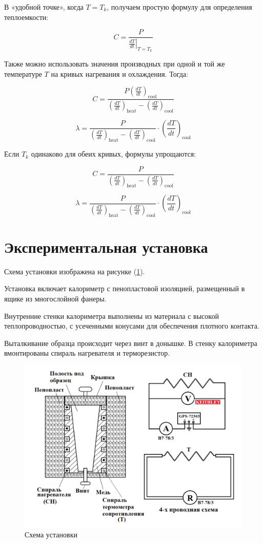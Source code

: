 \documentclass[a4paper,12pt]{article} %
\begin{document}
В «удобной точке», когда $T = T_k$, получаем простую формулу для определения теплоемкости:

\[
C = \frac{P}{\left. \frac{dT}{dt} \right|_{T = T_k}}
\]

Также можно использовать значения производных при одной и той же температуре $T$ на кривых нагревания и охлаждения. Тогда:

\[
C = \frac{P \left( \frac{dT}{dt} \right)_{\text{cool}}}{\left( \frac{dT}{dt} \right)_{\text{heat}} - \left( \frac{dT}{dt} \right)_{\text{cool}}}
\]

\[
\lambda = \frac{P}{\left( \frac{dT}{dt} \right)_{\text{heat}} - \left( \frac{dT}{dt} \right)_{\text{cool}}} \cdot \left( \frac{dT}{dt} \right)_{\text{cool}}
\]

Если $T_k$ одинаково для обеих кривых, формулы упрощаются:

\[
C = \frac{P}{\left( \frac{dT}{dt} \right)_{\text{heat}} - \left( \frac{dT}{dt} \right)_{\text{cool}}}
\]

\[
\lambda = \frac{P}{\left( \frac{dT}{dt} \right)_{\text{heat}} - \left( \frac{dT}{dt} \right)_{\text{cool}}} \cdot \left( \frac{dT}{dt} \right)_{\text{cool}}
\]


\section*{Экспериментальная установка}

Схема установки изображена на рисунке (\ref{fig:setup}). 

Установка включает калориметр с пенопластовой изоляцией, размещенный в ящике из многослойной фанеры. 

Внутренние стенки калориметра выполнены из материала с высокой теплопроводностью, с усеченными конусами для обеспечения плотного контакта. 

Выталкивание образца происходит через винт в донышке. В стенку калориметра вмонтированы спираль нагревателя и терморезистор.
\begin{figure}[h!]
  \centering
  \includegraphics[scale=0.6]{setup.png}
  \caption{Схема установки}
  \label{fig:setup}
\end{figure}
\end{document}
